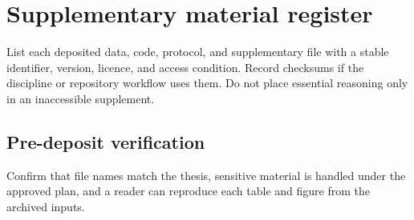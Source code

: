 \chapter{Supplementary material register}
\label{app:supplement}

List each deposited data, code, protocol, and supplementary file with a stable
identifier, version, licence, and access condition. Record checksums if the
discipline or repository workflow uses them. Do not place essential reasoning
only in an inaccessible supplement.

\section{Pre-deposit verification}

Confirm that file names match the thesis, sensitive material is handled under
the approved plan, and a reader can reproduce each table and figure from the
archived inputs.
